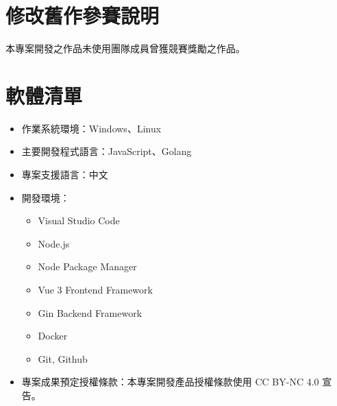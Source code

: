 \documentclass[12pt]{article}
\begin{document}
    

\section{修改舊作參賽說明}
  本專案開發之作品未使用團隊成員曾獲競賽獎勵之作品。
\section{軟體清單}
\begin{itemize}
  \item 作業系統環境：Windows、Linux
  \item 主要開發程式語言：JavaScript、Golang
  \item 專案支援語言：中文
  \item 開發環境：
  \begin{itemize}
    \item Visual Studio Code
    \item Node.js
    \item Node Package Manager
    \item Vue 3 Frontend Framework
    \item Gin Backend Framework
    \item Docker
    \item Git, Github
  \end{itemize}
  \item 專案成果預定授權條款：本專案開發產品授權條款使用 CC BY-NC 4.0 宣告。
\end{itemize}
\end{document}
